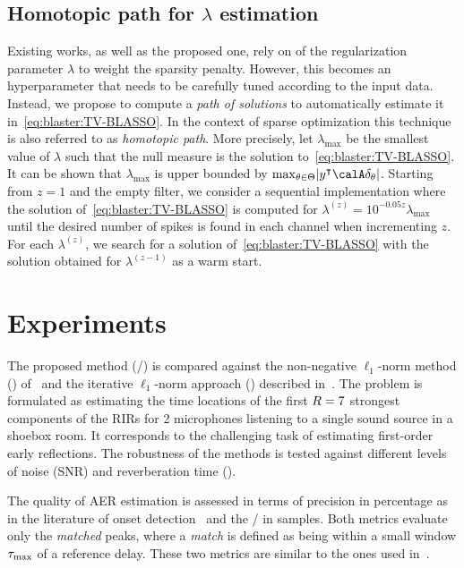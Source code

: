 \subsection{Homotopic path for $\lambda$ estimation}\label{sec:blaster:lambda}
Existing works, as well as the proposed one, rely on of the regularization parameter $\lambda$ to weight the sparsity penalty.
However, this becomes an hyperparameter that needs to be carefully tuned according to the input data.
Instead, we propose to compute a \textit{path of solutions} to automatically estimate it in~\cref{eq:blaster:TV-BLASSO}.
In the context of sparse optimization this technique is also referred to as \textit{homotopic path}.
More precisely, let $\lambda_{\max}$ be the smallest value of $\lambda$ such that the null measure is the solution to~\cref{eq:blaster:TV-BLASSO}.
It can be shown that $\lambda_{\max}$ is upper bounded by $\max_{\theta\in\Theta} \kvbar{y^\intercal\opObs\delta_\theta}$.
Starting from $z=1$ and the empty filter, we consider a sequential implementation where the solution of~\cref{eq:blaster:TV-BLASSO} is computed for $\lambda^{(z)}= 10^{-0.05z}\lambda_{\max}$ until the desired number of spikes is found in each channel when incrementing $z$.
For each $\lambda^(z)$, we search for a solution of~\cref{eq:blaster:TV-BLASSO} with the solution obtained for $\lambda^{(z-1)}$ as a warm start.

\section{Experiments}\label{sec:blaster:exp}
The proposed method (\BLASTER/) is compared against the non-negative $\ell_1$-norm method (\algoBsn) of~ and the iterative $\ell_1$-norm approach (\algoCrocco) described in~.
The problem is formulated as estimating the time locations of the first $R=7$ strongest components of the RIRs for 2 microphones listening to a single sound source in a shoebox room. It corresponds to the challenging task of estimating first-order early reflections.
The robustness of the methods is tested against different levels of noise (SNR) and reverberation time (\RT{}).

\mynewline
The quality of AER estimation is assessed in terms of precision
in percentage as in the literature of onset detection~ and the \RMSEtxt/ in samples.
Both metrics evaluate only the \textit{matched} peaks, where a \textit{match} is defined as being within a small window $\tau_\text{max}$ of a reference delay.
These two metrics are similar to the ones used in~.

